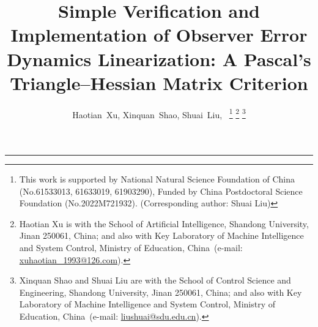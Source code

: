 \documentclass[11pt]{article}
\begin{document}
\title{\LARGE\bfseries Simple Verification and Implementation of Observer Error Dynamics Linearization: A Pascal's Triangle--Hessian Matrix Criterion}

\author{Haotian~Xu, Xinquan~Shao, Shuai~Liu,~	
\thanks{This work is supported by National Natural Science Foundation of China (No.61533013, 61633019, 61903290), Funded by China Postdoctoral Science Foundation (No.2022M721932). (Corresponding author: Shuai Liu)}
\thanks{Haotian Xu is with the School of Artificial Intelligence, Shandong University, Jinan 250061, China; and also with Key Laboratory of Machine Intelligence and System Control, Ministry of Education, China~(e-mail:  \href{mailto:xuhaotian\_1993@126.com}{xuhaotian\_1993@126.com}).}
\thanks{Xinquan Shao and Shuai Liu are with the School of Control Science and Engineering, Shandong University, Jinan 250061, China; and also with Key Laboratory of Machine Intelligence and System Control, Ministry of Education, China~(e-mail: \href{mailto:liushuai@sdu.edu.cn}{liushuai@sdu.edu.cn}).}}%


\date{}
\maketitle
\vspace{-6pt}
\begin{center}
	\rule{0.8\textwidth}{0.4pt}
\end{center}
\vspace{6pt}
\end{document}
